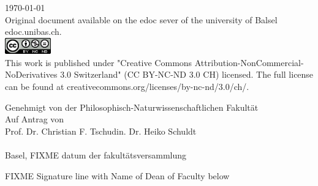 \begin{titlepage}
\begin{center}

{\large \today\\[1cm]}
{\footnotesize Original document available on the edoc sever of the university of Balsel edoc.unibas.ch.\\[0.5cm]
\includegraphics[height=7mm]{./inc/cc_lic}~\\[0.5cm]
This work is published under  "Creative Commons Attribution-NonCommercial-NoDerivatives 3.0 Switzerland" (CC BY-NC-ND 3.0 CH) licensed. The full license can be found at creativecommons.org/licenses/by-nc-nd/3.0/ch/.
}

\end{center}
\end{titlepage}

\begin{titlepage}
\pagecolor{orange}\afterpage{\nopagecolor}
\begin{center}
Genehmigt von der Philosophisch-Naturwissenschaftlichen Fakultät\\
Auf Antrag von\\
Prof. Dr. Christian F. Tschudin\Prof. Dr. Heiko Schuldt\\
\vfill \\
Basel, FIXME datum der fakultätsversammlung
{\raggedright FIXME Signature line with Name of Dean of Faculty below}

\end{center}
\end{titlepage}

